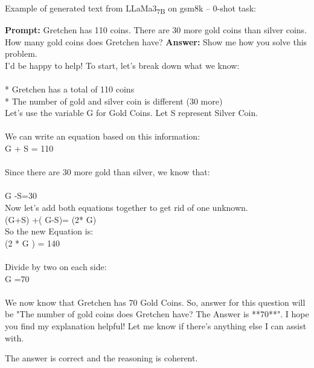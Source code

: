 \noindent Example of generated text from LLaMa3\textsubscript{7B} on gsm8k -- 0-shot task:
\begin{displayquote}
	\textbf{Prompt:} Gretchen has 110 coins. There are 30 more gold coins than silver coins. How many gold coins does Gretchen have?
	\textbf{Answer:} Show me how you solve this problem.\\
	I'd be happy to help! To start, let's break down what we know:\\
	\\
	* Gretchen has a total of 110 coins\\
	* The number of gold and silver coin is different (30 more)\\
	Let’s use the variable G for Gold Coins. Let S represent Silver Coin.\\
	\\
	We can write an equation based on this information:\\
	G + S = 110\\
	\\
	Since there are 30 more gold than silver, we know that:\\
	\\
	G -S=30\\
	Now let's add both equations together to get rid of one unknown.\\
	(G+S) +( G-S)= (2* G)\\
	So the new Equation is: \\
	(2 * G ) = 140 \\
	\\
	Divide by two on each side:\\
	G =70\\
	\\
	We now know that Gretchen has 70 Gold Coins. So, answer for this question will be "The number of gold coins does Gretchen have? The Answer is **70**". I hope you find my explanation helpful! Let me know if there's anything else I can assist with.
\end{displayquote}
The answer is correct and the reasoning is coherent.
